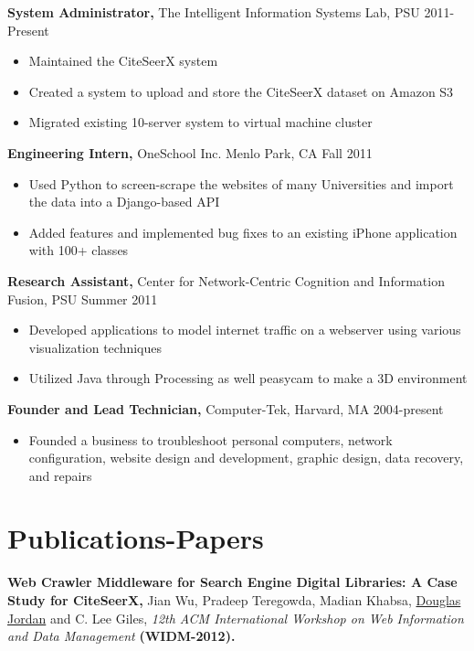 \documentclass[margin]{res}
\begin{document}
\begin{resume}
{\bf System Administrator,} The Intelligent Information Systems Lab, PSU \hfill 2011-Present
\begin{itemize} \itemsep -2pt  %
\item Maintained the CiteSeerX system 
\item Created a system to upload and store the CiteSeerX dataset on Amazon S3
\item Migrated existing 10-server system to virtual machine cluster 
\end{itemize}
 
{\bf Engineering Intern,} OneSchool Inc. Menlo Park, CA \hfill Fall 2011
\begin{itemize} \itemsep -2pt %
\item Used Python to screen-scrape the websites of many Universities and import the data into a Django-based API
\item Added features and implemented bug fixes to an existing iPhone application with 100+ classes
\end{itemize}

{\bf Research Assistant,} Center for Network-Centric Cognition and Information Fusion, PSU \hfill Summer 2011
\begin{itemize} \itemsep -2pt
\item Developed applications to model internet traffic on a webserver using various visualization techniques 
\item Utilized Java through Processing as well peasycam to make a 3D environment
\end{itemize}

{\bf Founder and Lead Technician,} Computer-Tek, Harvard, MA \hfill 2004-present
\begin{itemize} \itemsep -2pt
\item Founded a business to troubleshoot personal computers, network configuration, website design and development, graphic design, data recovery, and repairs
\end{itemize}

\section{Publications-Papers}
{\bf Web Crawler Middleware for Search Engine Digital Libraries: A Case Study for CiteSeerX,} Jian Wu, Pradeep Teregowda, Madian Khabsa, \underline{Douglas Jordan} and C. Lee Giles, \emph{12th ACM International Workshop on Web Information and Data Management} {\bf (WIDM-2012).}


\end{resume}
\end{document}
